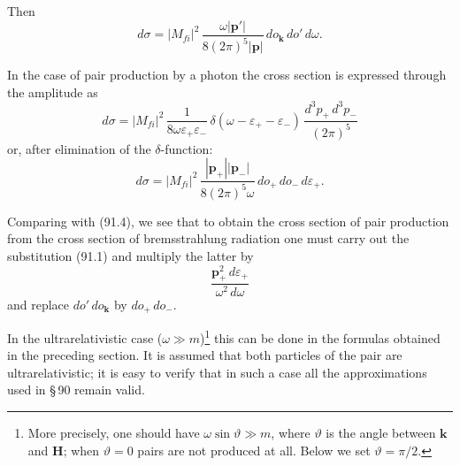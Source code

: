 Then
\begin{equation}
d\sigma = |M_{fi}|^2\,\frac{\omega|\mathbf{p}'|}{8(2\pi)^5|\mathbf{p}|}\,do_\mathbf{k}\,do'\,d\omega.
\label{eq:91.4}
\end{equation}

In the case of pair production by a photon the cross section is expressed through the amplitude as
\[
d\sigma = |M_{fi}|^2\,\frac{1}{8\omega\varepsilon_+\varepsilon_-}\,\delta(\omega - \varepsilon_+ - \varepsilon_-)\,\frac{d^3p_+\,d^3p_-}{(2\pi)^5}
\]
or, after elimination of the $\delta$-function:
\begin{equation}
d\sigma = |M_{fi}|^2\,\frac{|\mathbf{p}_+||\mathbf{p}_-|}{8(2\pi)^5\omega}\,do_+\,do_-\,d\varepsilon_+.
\label{eq:91.5}
\end{equation}

Comparing with (91.4), we see that to obtain the cross section of pair production from the cross section of bremsstrahlung radiation one must carry out the substitution (91.1) and multiply the latter by
\begin{equation}
\frac{\mathbf{p}_+^2\,d\varepsilon_+}{\omega^2\,d\omega}
\label{eq:91.6}
\end{equation}
and replace $do'\,do_\mathbf{k}$ by $do_+\,do_-$.

In the ultrarelativistic case ($\omega \gg m$)\footnote{More precisely, one should have $\omega\sin\vartheta \gg m$, where $\vartheta$ is the angle between $\mathbf{k}$ and $\mathbf{H}$; when $\vartheta = 0$ pairs are not produced at all. Below we set $\vartheta = \pi/2$.} this can be done in the formulas obtained in the preceding section. It is assumed that both particles of the pair are ultrarelativistic; it is easy to verify that in such a case all the approximations used in \S\,90 remain valid.

